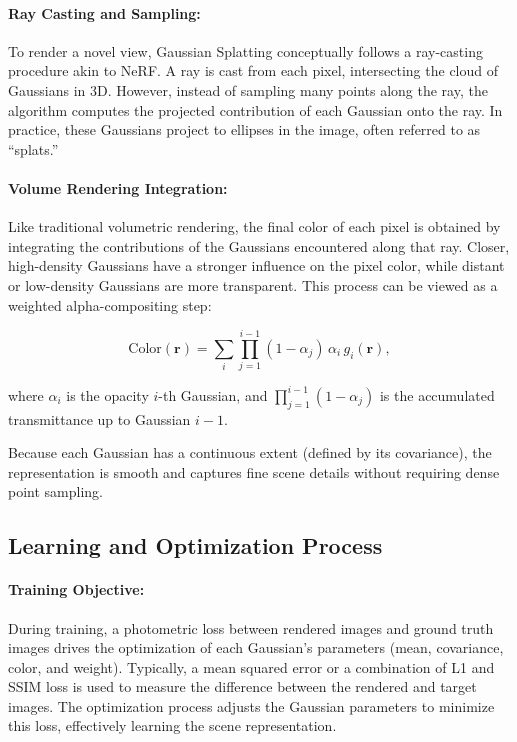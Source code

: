 \paragraph{Ray Casting and Sampling:}
To render a novel view, Gaussian Splatting conceptually follows a ray-casting procedure akin to NeRF.
A ray is cast from each pixel, intersecting the cloud of Gaussians in 3D.
However, instead of sampling many points along the ray, the algorithm computes the projected contribution of each Gaussian onto the ray.
In practice, these Gaussians project to ellipses in the image, often referred to as “splats.”

\paragraph{Volume Rendering Integration:}
Like traditional volumetric rendering, the final color of each pixel is obtained by integrating the contributions of the Gaussians encountered along that ray.
Closer, high-density Gaussians have a stronger influence on the pixel color, while distant or low-density Gaussians are more transparent.
This process can be viewed as a weighted alpha-compositing step:


\begin{equation}
    \text{Color}(\mathbf{r}) = \sum_{i} \prod_{j=1}^{i-1}(1 - \alpha_j) \,\alpha_i \,g_i(\mathbf{r}),
\end{equation}

where $\alpha_i$ is the opacity $i$-th Gaussian, and $\prod_{j=1}^{i-1}(1 - \alpha_j)$ is the accumulated transmittance up to Gaussian $i-1$.

Because each Gaussian has a continuous extent (defined by its covariance), the representation is smooth and captures fine scene details without requiring dense point sampling.

\subsection{Learning and Optimization Process}
\paragraph{Training Objective:}
During training, a photometric loss between rendered images and ground truth images drives the optimization of each Gaussian's parameters (mean, covariance, color, and weight).
Typically, a mean squared error or a combination of L1 and SSIM loss is used to measure the difference between the rendered and target images.
The optimization process adjusts the Gaussian parameters to minimize this loss, effectively learning the scene representation.

